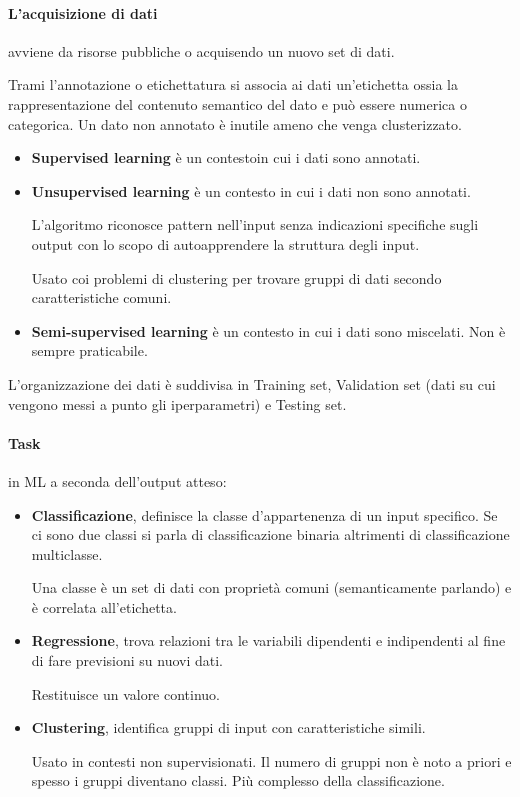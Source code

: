 \paragraph{L'acquisizione di dati} avviene da risorse pubbliche o acquisendo un nuovo set di dati.

Trami l'annotazione o etichettatura si associa ai dati un'etichetta ossia la rappresentazione del contenuto semantico del dato e può essere numerica o categorica.
Un dato non annotato è inutile ameno che venga clusterizzato.
\begin{itemize}
	\item \textbf{Supervised learning} è un contestoin cui i dati sono annotati.
	\item \textbf{Unsupervised learning} è un contesto in cui i dati non sono annotati.

	L'algoritmo riconosce pattern nell'input senza indicazioni specifiche sugli output con lo scopo di autoapprendere la struttura degli input.

	Usato coi problemi di clustering per trovare gruppi di dati secondo caratteristiche comuni.
	\item \textbf{Semi-supervised learning} è un contesto in cui i dati sono miscelati. Non è sempre praticabile.
\end{itemize}
L'organizzazione dei dati è suddivisa in Training set, Validation set (dati su cui vengono messi a punto gli iperparametri) e Testing set.

\paragraph{Task} in ML a seconda dell'output atteso:
\begin{itemize}
	\item \textbf{Classificazione}, definisce la classe d'appartenenza di un input specifico. Se ci sono due classi si parla di classificazione binaria altrimenti di classificazione multiclasse.

	Una classe è un set di dati con proprietà comuni (semanticamente parlando) e è correlata all'etichetta.
	\item \textbf{Regressione}, trova relazioni tra le variabili dipendenti e indipendenti al fine di fare previsioni su nuovi dati.

	Restituisce un valore continuo.
	\item \textbf{Clustering}, identifica gruppi di input con caratteristiche simili.

	Usato in contesti non supervisionati. Il numero di gruppi non è noto a priori e spesso i gruppi diventano classi. Più complesso della classificazione.
\end{itemize}
